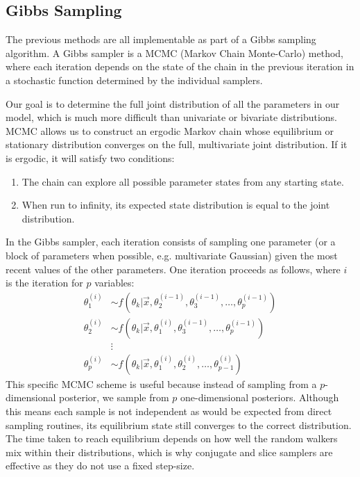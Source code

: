 \documentclass[a4paper, 12pt]{article}
\begin{document}
\subsection{Gibbs Sampling}
The previous methods are all implementable as part of a Gibbs sampling algorithm. A Gibbs sampler is a MCMC (Markov Chain Monte-Carlo) method, where each iteration depends on the state of the chain in the previous iteration in a stochastic function determined by the individual samplers.

Our goal is to determine the full joint distribution of all the parameters in our model, which is much more difficult than univariate or bivariate distributions. MCMC allows us to construct an ergodic Markov chain whose equilibrium or stationary distribution converges on the full, multivariate joint distribution. If it is ergodic, it will satisfy two conditions:

\begin{enumerate}
\item The chain can explore all possible parameter states from any starting state.
\item When run to infinity, its expected state distribution is equal to the joint distribution.
\end{enumerate}

In the Gibbs sampler, each iteration consists of sampling one parameter (or a block of parameters when possible, e.g. multivariate Gaussian) given the most recent values of the other parameters. One iteration proceeds as follows, where $i$ is the iteration for $p$ variables:
\begin{align}
\theta_1^{(i)} &\sim f\left( \theta_k|\vec{x}, \theta_2^{(i-1)}, \theta_3^{(i-1)},\dots, \theta_p^{(i-1)} \right)\\
\theta_2^{(i)} &\sim f\left( \theta_k|\vec{x}, \theta_1^{(i)}, \theta_3^{(i-1)},\dots, \theta_p^{(i-1)} \right)\\
&\vdots\\
\theta_p^{(i)} &\sim f\left( \theta_k|\vec{x}, \theta_1^{(i)}, \theta_2^{(i)},\dots, \theta_{p-1}^{(i)} \right)
\end{align}
This specific MCMC scheme is useful because instead of sampling from a $p$-dimensional posterior, we sample from $p$ one-dimensional posteriors. Although this means each sample is not independent as would be expected from direct sampling routines, its equilibrium state still converges to the correct distribution. The time taken to reach equilibrium depends on how well the random walkers mix within their distributions, which is why conjugate and slice samplers are effective as they do not use a fixed step-size.
\end{document}
